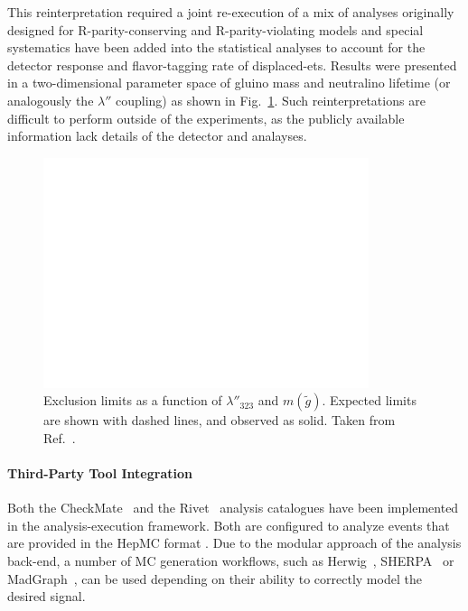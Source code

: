 This reinterpretation required a joint re-execution of a mix of analyses originally designed for R-parity-conserving and R-parity-violating models and special systematics have been added into the statistical analyses to account for the detector response and flavor-tagging rate of displaced-ets. Results were presented in a two-dimensional parameter space of gluino mass and neutralino lifetime (or analogously the $\lambda''$ coupling) as shown in Fig.~\ref{fig:rpvrpc}. Such reinterpretations are difficult to perform outside of the experiments, as the publicly available information lack details of the detector and analayses.

\begin{figure}[h]
\begin{center}
\includegraphics[width=0.85\textwidth,angle=0]{ch5-figures/fig_04.pdf}
\end{center}
\caption{Exclusion limits as a function of $\lambda''_{323}$ and $m({\tilde{g}})$. Expected limits are shown with dashed lines, and observed as solid. Taken from Ref.~\cite{ATLAS:2018yey}.}
\label{fig:rpvrpc}
\end{figure}



\paragraph{Third-Party Tool Integration }

Both the CheckMate~\cite{Drees:2013wra,Dercks:2016npn} and the Rivet~\cite{Buckley:2010ar} analysis catalogues have been implemented in the analysis-execution framework. Both are configured to analyze events that are provided in the HepMC format
\cite{Dobbs:2001ck}. Due to the modular approach of the analysis back-end, a number of MC generation workflows, such as Herwig~\cite{Marchesini:1991ch}, SHERPA~\cite{Gleisberg:2008ta} or MadGraph~\cite{Alwall:2011uj}, can be used depending on their ability to correctly model the desired signal.

